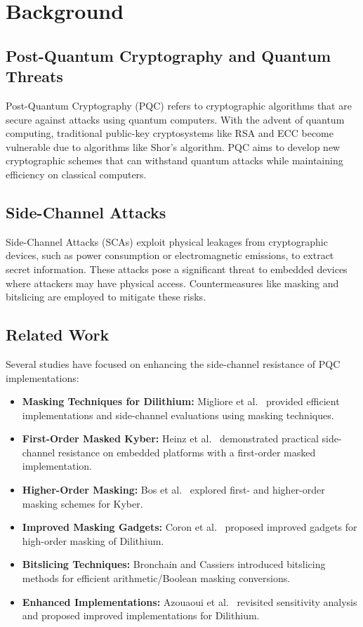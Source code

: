 \chapter{Background}

\section{Post-Quantum Cryptography and Quantum Threats}

Post-Quantum Cryptography (PQC) refers to cryptographic algorithms that are secure against attacks using quantum computers. With the advent of quantum computing, traditional public-key cryptosystems like RSA and ECC become vulnerable due to algorithms like Shor's algorithm. PQC aims to develop new cryptographic schemes that can withstand quantum attacks while maintaining efficiency on classical computers.

\section{Side-Channel Attacks}

Side-Channel Attacks (SCAs) exploit physical leakages from cryptographic devices, such as power consumption or electromagnetic emissions, to extract secret information. These attacks pose a significant threat to embedded devices where attackers may have physical access. Countermeasures like masking and bitslicing are employed to mitigate these risks.

\section{Related Work}

Several studies have focused on enhancing the side-channel resistance of PQC implementations:

\begin{itemize}
    \item \textbf{Masking Techniques for Dilithium:} Migliore et al.\ \cite{Migliore19} provided efficient implementations and side-channel evaluations using masking techniques.
    \item \textbf{First-Order Masked Kyber:} Heinz et al.\ \cite{Heinz20} demonstrated practical side-channel resistance on embedded platforms with a first-order masked implementation.
    \item \textbf{Higher-Order Masking:} Bos et al.\ \cite{Bos21} explored first- and higher-order masking schemes for Kyber.
    \item \textbf{Improved Masking Gadgets:} Coron et al.\ \cite{Coron23} proposed improved gadgets for high-order masking of Dilithium.
    \item \textbf{Bitslicing Techniques:} Bronchain and Cassiers \cite{Bronchain22} introduced bitslicing methods for efficient arithmetic/Boolean masking conversions.
    \item \textbf{Enhanced Implementations:} Azouaoui et al.\ \cite{Azouaoui22} revisited sensitivity analysis and proposed improved implementations for Dilithium.
\end{itemize}
